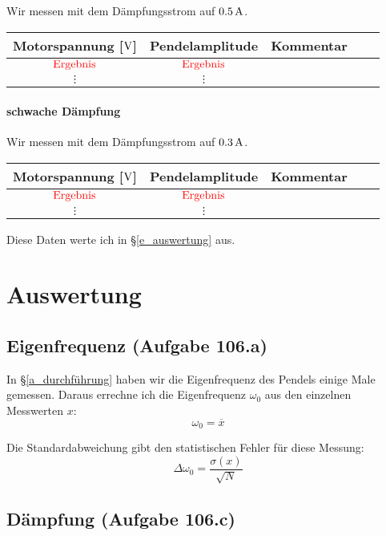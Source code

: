 \documentclass[11pt]{article}
\newcommand{\ergebnis}{\textcolor{red}{\mathrm{Ergebnis}}}
\begin{document}
Wir messen mit dem Dämpfungsstrom auf $\unit[0.5]A$.

\begin{tabular}{ccccr}
	Motorspannung [$\unit V$] & Pendelamplitude & Kommentar \\
	\hline
	$\ergebnis$ & $\ergebnis$ & \\
	$\vdots$ & $\vdots$ & \\
\end{tabular}

\paragraph{schwache Dämpfung}

Wir messen mit dem Dämpfungsstrom auf $\unit[0.3]A$.

\begin{tabular}{ccccr}
	Motorspannung [$\unit V$] & Pendelamplitude & Kommentar \\
	\hline
	$\ergebnis$ & $\ergebnis$ & \\
	$\vdots$ & $\vdots$ & \\
\end{tabular}

Diese Daten werte ich in §\ref{e_auswertung} aus.


\section{Auswertung}

\subsection{Eigenfrequenz (Aufgabe 106.a)}
\label{a_auswertung}

In §\ref{a_durchführung} haben wir die Eigenfrequenz des Pendels einige Male
gemessen. Daraus errechne ich die Eigenfrequenz $\omega_0$ aus den einzelnen
Messwerten $x$:
\[ \omega_0 = \overline x \]

Die Standardabweichung gibt den statistischen Fehler für diese Messung:
\[ \Delta \omega_0 = \frac{\sigma(x)}{\sqrt{N}} \]

\subsection{Dämpfung (Aufgabe 106.c)}
\label{c_auswertung}
\end{document}
